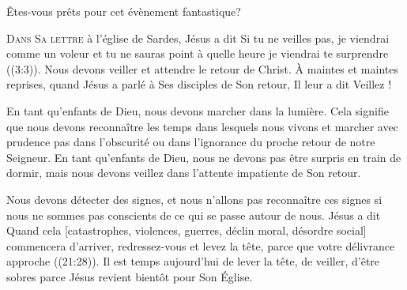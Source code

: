 Êtes-vous prêts pour cet évènement fantastique?

\dvrule






\lettrine{D}{ans Sa lettre} à l'église de Sardes,
 Jésus a dit\frcolon{} 
 \Og Si tu ne veilles pas, je viendrai comme un voleur et tu ne sauras point
 à quelle heure je viendrai te surprendre \Fg{} ((3:3)).
 Nous devons veiller et attendre le retour de Christ.
 À maintes et maintes reprises, quand Jésus a parlé à Ses disciples
 de Son retour, Il leur a dit\frcolon{}  \Og Veillez ! \Fg{}


En tant qu'enfants de Dieu, nous devons marcher dans la lumière.
 Cela signifie que nous devons reconnaître les temps dans lesquels nous vivons
 et marcher avec prudence \ocadr pas dans l'obscurité ou dans l'ignorance
 du proche retour de notre Seigneur. En tant qu'enfants de Dieu,
 nous ne devons pas être surpris en train de dormir,
 mais nous devons veillez dans l'attente impatiente de Son retour.

Nous devons détecter des signes, et nous n'allons pas reconnaître ces signes
 si nous ne sommes pas conscients de ce qui se passe autour de nous.
 Jésus a dit\frcolon{} 
 \Og Quand cela [catastrophes, violences, guerres, déclin moral,
 désordre social] commencera d'arriver, redressez-vous et levez la tête,
 parce que votre délivrance approche \Fg{} ((21:28)).
 Il est temps aujourd'hui de lever la tête, de veiller, d'être sobres
 \ocadr parce Jésus revient bientôt pour Son Église. 

\dvrule




